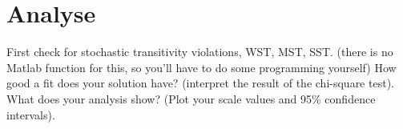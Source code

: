 \section*{Analyse}
\label{Analyse}
%
First check for stochastic transitivity violations, WST, MST, SST. (there is no Matlab function for this, so you’ll have to do some programming yourself)
How good a fit does your solution have? (interpret the result of the chi-square test).
What does your analysis show? (Plot your scale values and 95\% confidence intervals).